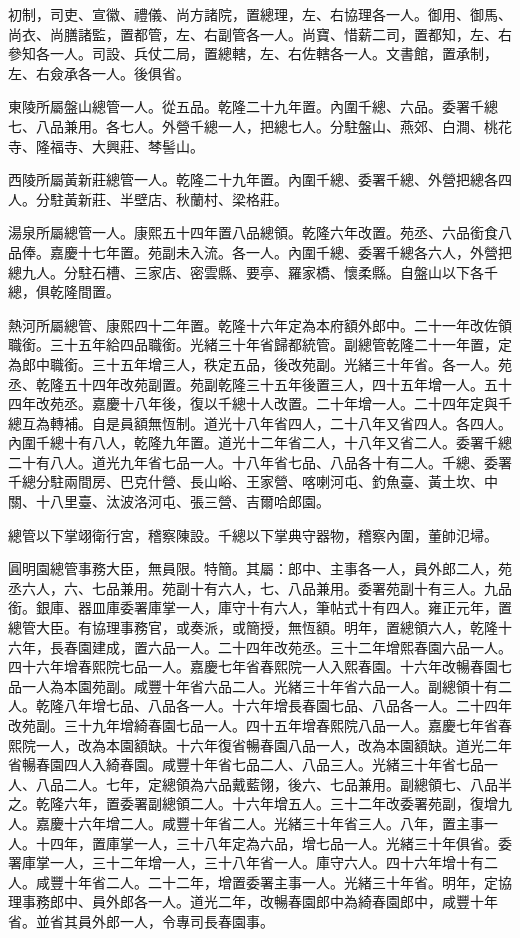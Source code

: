 \begin{pinyinscope}
初制，司吏、宣徽、禮儀、尚方諸院，置總理，左、右協理各一人。御用、御馬、尚衣、尚膳諸監，置都管，左、右副管各一人。尚寶、惜薪二司，置都知，左、右參知各一人。司設、兵仗二局，置總轄，左、右佐轄各一人。文書館，置承制，左、右僉承各一人。後俱省。

東陵所屬盤山總管一人。從五品。乾隆二十九年置。內圍千總、六品。委署千總七、八品兼用。各七人。外營千總一人，把總七人。分駐盤山、燕郊、白澗、桃花寺、隆福寺、大興莊、棽髻山。

西陵所屬黃新莊總管一人。乾隆二十九年置。內圍千總、委署千總、外營把總各四人。分駐黃新莊、半壁店、秋蘭村、梁格莊。

湯泉所屬總管一人。康熙五十四年置八品總領。乾隆六年改置。苑丞、六品銜食八品俸。嘉慶十七年置。苑副未入流。各一人。內圍千總、委署千總各六人，外營把總九人。分駐石槽、三家店、密雲縣、要亭、羅家橋、懷柔縣。自盤山以下各千總，俱乾隆間置。

熱河所屬總管、康熙四十二年置。乾隆十六年定為本府額外郎中。二十一年改佐領職銜。三十五年給四品職銜。光緒三十年省歸都統管。副總管乾隆二十一年置，定為郎中職銜。三十五年增三人，秩定五品，後改苑副。光緒三十年省。各一人。苑丞、乾隆五十四年改苑副置。苑副乾隆三十五年後置三人，四十五年增一人。五十四年改苑丞。嘉慶十八年後，復以千總十人改置。二十年增一人。二十四年定與千總互為轉補。自是員額無恆制。道光十八年省四人，二十八年又省四人。各四人。內圍千總十有八人，乾隆九年置。道光十二年省二人，十八年又省二人。委署千總二十有八人。道光九年省七品一人。十八年省七品、八品各十有二人。千總、委署千總分駐兩間房、巴克什營、長山峪、王家營、喀喇河屯、釣魚臺、黃土坎、中關、十八里臺、汰波洛河屯、張三營、吉爾哈郎園。

總管以下掌翊衛行宮，稽察陳設。千總以下掌典守器物，稽察內圍，董帥氾埽。

圓明園總管事務大臣，無員限。特簡。其屬：郎中、主事各一人，員外郎二人，苑丞六人，六、七品兼用。苑副十有六人，七、八品兼用。委署苑副十有三人。九品銜。銀庫、器皿庫委署庫掌一人，庫守十有六人，筆帖式十有四人。雍正元年，置總管大臣。有協理事務官，或奏派，或簡授，無恆額。明年，置總領六人，乾隆十六年，長春園建成，置六品一人。二十四年改苑丞。三十二年增熙春園六品一人。四十六年增春熙院七品一人。嘉慶七年省春熙院一人入熙春園。十六年改暢春園七品一人為本園苑副。咸豐十年省六品二人。光緒三十年省六品一人。副總領十有二人。乾隆八年增七品、八品各一人。十六年增長春園七品、八品各一人。二十四年改苑副。三十九年增綺春園七品一人。四十五年增春熙院八品一人。嘉慶七年省春熙院一人，改為本園額缺。十六年復省暢春園八品一人，改為本園額缺。道光二年省暢春園四人入綺春園。咸豐十年省七品二人、八品三人。光緒三十年省七品一人、八品二人。七年，定總領為六品戴藍翎，後六、七品兼用。副總領七、八品半之。乾隆六年，置委署副總領二人。十六年增五人。三十二年改委署苑副，復增九人。嘉慶十六年增二人。咸豐十年省二人。光緒三十年省三人。八年，置主事一人。十四年，置庫掌一人，三十八年定為六品，增七品一人。光緒三十年俱省。委署庫掌一人，三十二年增一人，三十八年省一人。庫守六人。四十六年增十有二人。咸豐十年省二人。二十二年，增置委署主事一人。光緒三十年省。明年，定協理事務郎中、員外郎各一人。道光二年，改暢春園郎中為綺春園郎中，咸豐十年省。並省其員外郎一人，令專司長春園事。


\end{pinyinscope}
